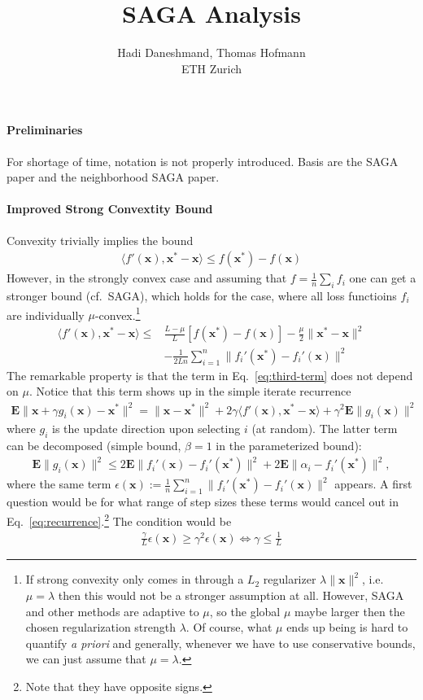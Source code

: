\documentclass{article}
\title{SAGA Analysis}
\author{Hadi Daneshmand, Thomas Hofmann\\ ETH Zurich}
\newcommand{\E}{{\mathbf E}}
\newcommand{\x}{{\mathbf x}}
\begin{document}
\maketitle

\paragraph{Preliminaries} For shortage of time, notation is not properly introduced. Basis are the SAGA paper and the neighborhood SAGA paper. 

\paragraph{Improved Strong Convextity Bound}

Convexity trivially implies the bound 
\begin{align}
\langle f'(\x) , \x^* - \x \rangle \le  f(\x^*)-f(\x)
\end{align} 
However, in the strongly convex case and assuming that $f = \frac 1n \sum_i f_i$ one can get a stronger bound (cf.~SAGA), which holds for the case, where all loss functioins $f_i$ are individually $\mu$-convex.\footnote{If strong convexity only comes in through a $L_2$ regularizer $\lambda \| \x \|^2$, i.e.~$\mu = \lambda$ then this would not be a stronger assumption at all. However, SAGA and other methods are adaptive to $\mu$, so the global $\mu$ maybe larger then the chosen regularization strength $\lambda$. Of course, what $\mu$ ends up being is hard to quantify \textit{a priori} and generally, whenever we have to use conservative bounds, we can just assume that $\mu = \lambda$.}
\begin{align}
\langle f'(\x) , \x^* - \x \rangle \le &  \frac {L-\mu}{L} \left[ f(\x^*) - f(\x) \right] -  \frac \mu 2 \| \x^* - \x\|^2 \\
& - \frac{1}{2Ln} \sum_{i=1}^n \| f_i'(\x^*) - f_i'(\x) \|^2 \label{eq:third-term}
\end{align} 
The remarkable property is that the term in Eq.~\eqref{eq:third-term} does not depend on $\mu$. Notice that this term shows up in the simple iterate recurrence 
\begin{align}
\E \| \x + \gamma g_i(\x) - \x^* \|^2 = \| \x - \x^* \|^2  + 2 \gamma \langle f'(\x) , \x^* - \x \rangle + \gamma^2 \E \| g_i(\x)\|^2
\label{eq:recurrence}
\end{align}
where $g_i$ is the update direction upon selecting $i$ (at random). The latter term can be decomposed (simple bound, $\beta=1$ in the parameterized bound): 
\begin{align}
\E \| g_i(\x)\|^2 \le 2 \E \| f_i'(\x) - f_i'(\x^*) \|^2 + 2 \E \| \alpha_i - f_i'(\x^*)\|^2, 
\end{align}
where the same term $\epsilon(\x) := \frac 1n \sum_{i=1}^n \| f_i'(\x^*) - f_i'(\x) \|^2$ appears. A first question would be for what range of step sizes these terms would cancel out in Eq.~\eqref{eq:recurrence}.\footnote{Note that they have opposite signs.} The condition would be 
\begin{align}
\frac \gamma {L} \epsilon(\x) \ge \gamma^2 \epsilon(\x) \iff \gamma \le \frac 1L
\end{align}
\end{document}
